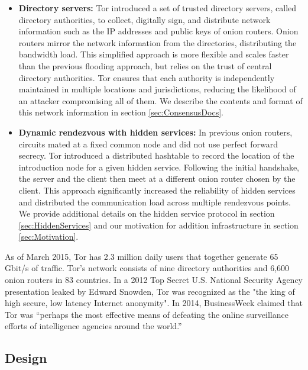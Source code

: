 \begin{itemize}
	\item \textbf{Directory servers:} Tor introduced a set of trusted directory servers, called directory authorities, to collect, digitally sign, and distribute network information such as the IP addresses and public keys of onion routers. Onion routers mirror the network information from the directories, distributing the bandwidth load. This simplified approach is more flexible and scales faster than the previous flooding approach, but relies on the trust of central directory authorities. Tor ensures that each authority is independently maintained in multiple locations and jurisdictions, reducing the likelihood of an attacker compromising all of them.\cite{syverson2011peel} We describe the contents and format of this network information in section \ref{sec:ConsensusDocs}.
	\item \textbf{Dynamic rendezvous with hidden services:} In previous onion routers, circuits mated at a fixed common node and did not use perfect forward secrecy. Tor introduced a distributed hashtable to record the location of the introduction node for a given hidden service. Following the initial handshake, the server and the client then meet at a different onion router chosen by the client. This approach significantly increased the reliability of hidden services and distributed the communication load across multiple rendezvous points.\cite{dingledine2004tor} We provide additional details on the hidden service protocol in section \ref{sec:HiddenServices} and our motivation for addition infrastructure in section \ref{sec:Motivation}.
\end{itemize}

As of March 2015, Tor has 2.3 million daily users that together generate 65 Gbit/s of traffic. Tor's network consists of nine directory authorities and 6,600 onion routers in 83 countries.\cite{TorMetrics} In a 2012 Top Secret U.S. National Security Agency presentation leaked by Edward Snowden, Tor was recognized as the "the king of high secure, low latency Internet anonymity".\cite{landau2014highlights}\cite{plak2014anonymous} In 2014, BusinessWeek claimed that Tor was ``perhaps the most effective means of defeating the online surveillance efforts of intelligence agencies around the world.''\cite{TorBusinessWeek}

\subsection{Design}

